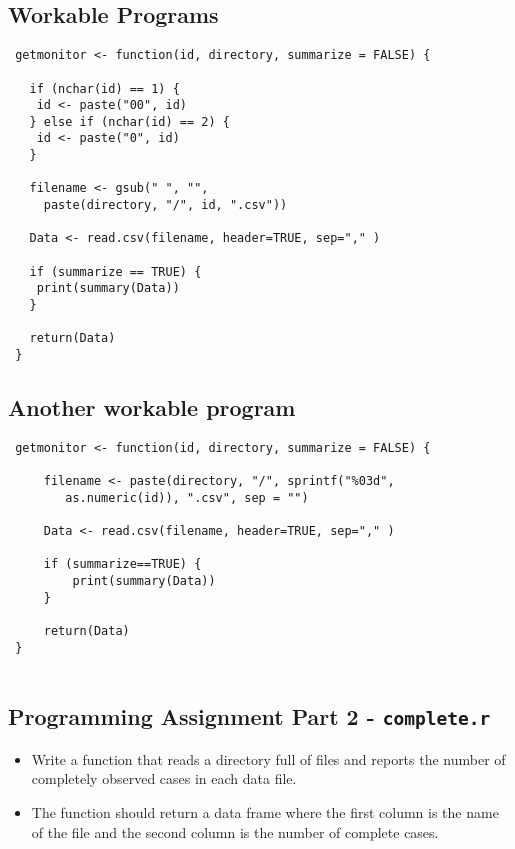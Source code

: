 \documentclass[]{article}
\begin{document}
\subsection{Workable Programs}
\begin{framed}
\begin{verbatim}
 getmonitor <- function(id, directory, summarize = FALSE) {
 
   if (nchar(id) == 1) {
   	id <- paste("00", id)
   } else if (nchar(id) == 2) {
   	id <- paste("0", id)
   }
 
   filename <- gsub(" ", "", 
     paste(directory, "/", id, ".csv"))
   
   Data <- read.csv(filename, header=TRUE, sep="," )
 
   if (summarize == TRUE) {
   	print(summary(Data))
   }
 
   return(Data)
 }
  \end{verbatim}
 \end{framed}
 \newpage
\subsection{Another workable program}
 \begin{framed}
 \begin{verbatim}
 getmonitor <- function(id, directory, summarize = FALSE) {
 
     filename <- paste(directory, "/", sprintf("%03d", 
        as.numeric(id)), ".csv", sep = "")
 
     Data <- read.csv(filename, header=TRUE, sep="," )
 
     if (summarize==TRUE) {
         print(summary(Data))
     }
 
     return(Data)
 }
 
 \end{verbatim}
  \end{framed}
\newpage


\subsection{Programming Assignment Part 2 - \texttt{complete.r}}
\begin{itemize}
\item Write a function that reads a directory full of files and reports the number of completely observed cases in each data file. \item The function should return a data frame where the first column is the name of the file and the second column is the number of complete cases.
\end{itemize}
\end{document}
